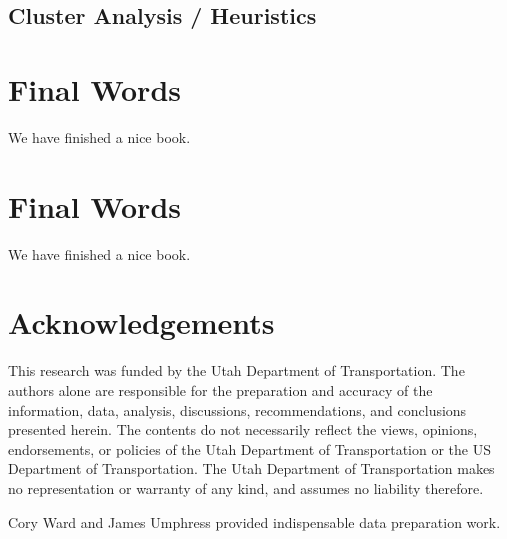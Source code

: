 \documentclass[numbered]{trbarticle}
\begin{document}
\hypertarget{cluster-analysis-heuristics}{%
\subsection{Cluster Analysis / Heuristics}\label{cluster-analysis-heuristics}}

\hypertarget{final-words}{%
\section{Final Words}\label{final-words}}

We have finished a nice book.

\hypertarget{final-words-1}{%
\section{Final Words}\label{final-words-1}}

We have finished a nice book.

\hypertarget{acknowledgements}{%
\section*{Acknowledgements}\label{acknowledgements}}

This research was funded by the Utah Department of Transportation. The authors
alone are responsible for the preparation and accuracy of the information, data,
analysis, discussions, recommendations, and conclusions presented herein. The
contents do not necessarily reflect the views, opinions, endorsements, or
policies of the Utah Department of Transportation or the US Department of
Transportation. The Utah Department of Transportation makes no representation or
warranty of any kind, and assumes no liability therefore.

Cory Ward and James Umphress provided indispensable data preparation work.

\newpage

\end{document}
